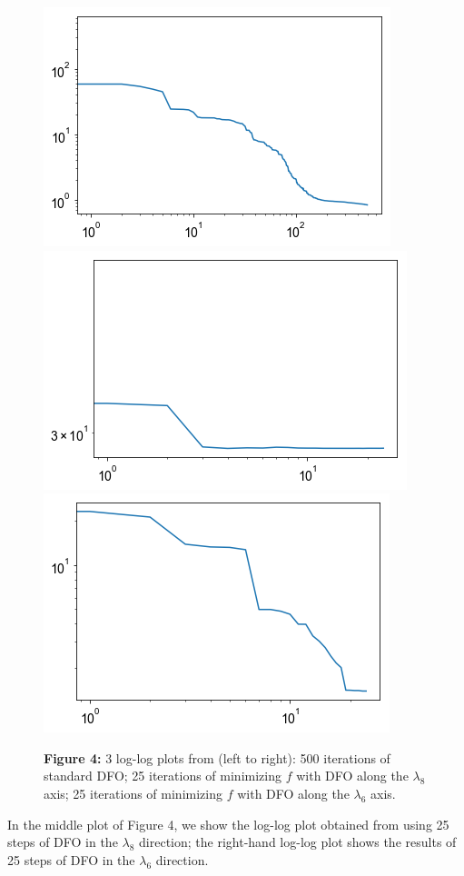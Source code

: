 \documentclass{amsart}
\begin{document}
\begin{figure} 
\includegraphics[scale=0.3]{stars.png} \includegraphics[scale=0.3]{minvec2.png} \includegraphics[scale=0.3]{minvec4.png}

\textbf{Figure 4:} 3 log-log plots from (left to right): 500 iterations of standard DFO; 25 iterations of minimizing $f$ with DFO along the $\lambda_8$ axis; 25 iterations of minimizing $f$ with DFO along the $\lambda_6$ axis.
\end{figure} 

In the middle plot of Figure 4, we show the log-log plot obtained from using 25 steps of DFO in the $\lambda_8$ direction; the right-hand log-log plot shows the results of 25 steps of DFO in the $\lambda_6$ direction.
\end{document}
